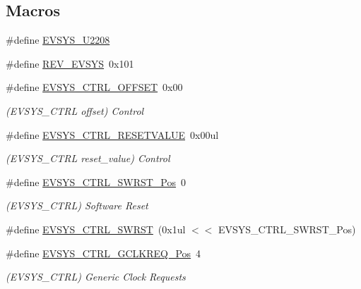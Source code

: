 \subsection*{Macros}
\begin{DoxyCompactItemize}
\item 
\#define \mbox{\hyperlink{group___s_a_m_d21___e_v_s_y_s_ga302b18faf55a928952583067fb99f216}{E\+V\+S\+Y\+S\+\_\+\+U2208}}
\item 
\#define \mbox{\hyperlink{group___s_a_m_d21___e_v_s_y_s_ga973936e91b4175039038db84c581d977}{R\+E\+V\+\_\+\+E\+V\+S\+YS}}~0x101
\item 
\#define \mbox{\hyperlink{group___s_a_m_d21___e_v_s_y_s_gaf12e51333353e278643527fe9c70e572}{E\+V\+S\+Y\+S\+\_\+\+C\+T\+R\+L\+\_\+\+O\+F\+F\+S\+ET}}~0x00
\begin{DoxyCompactList}\small\item\em (E\+V\+S\+Y\+S\+\_\+\+C\+T\+RL offset) Control \end{DoxyCompactList}\item 
\#define \mbox{\hyperlink{group___s_a_m_d21___e_v_s_y_s_ga28dc9aa8a2b2bb58177c09902b9a476a}{E\+V\+S\+Y\+S\+\_\+\+C\+T\+R\+L\+\_\+\+R\+E\+S\+E\+T\+V\+A\+L\+UE}}~0x00ul
\begin{DoxyCompactList}\small\item\em (E\+V\+S\+Y\+S\+\_\+\+C\+T\+RL reset\+\_\+value) Control \end{DoxyCompactList}\item 
\#define \mbox{\hyperlink{group___s_a_m_d21___e_v_s_y_s_gac38a8366d704219f852fdf910470ceb9}{E\+V\+S\+Y\+S\+\_\+\+C\+T\+R\+L\+\_\+\+S\+W\+R\+S\+T\+\_\+\+Pos}}~0
\begin{DoxyCompactList}\small\item\em (E\+V\+S\+Y\+S\+\_\+\+C\+T\+RL) Software Reset \end{DoxyCompactList}\item 
\#define \mbox{\hyperlink{group___s_a_m_d21___e_v_s_y_s_ga0f30a9be04a3581f03205e17f37c8143}{E\+V\+S\+Y\+S\+\_\+\+C\+T\+R\+L\+\_\+\+S\+W\+R\+ST}}~(0x1ul $<$$<$ E\+V\+S\+Y\+S\+\_\+\+C\+T\+R\+L\+\_\+\+S\+W\+R\+S\+T\+\_\+\+Pos)
\item 
\#define \mbox{\hyperlink{group___s_a_m_d21___e_v_s_y_s_ga199431edb74a5ba4d24f4d34abc242be}{E\+V\+S\+Y\+S\+\_\+\+C\+T\+R\+L\+\_\+\+G\+C\+L\+K\+R\+E\+Q\+\_\+\+Pos}}~4
\begin{DoxyCompactList}\small\item\em (E\+V\+S\+Y\+S\+\_\+\+C\+T\+RL) Generic Clock Requests \end{DoxyCompactList}\item 
$$
\end{DoxyCompactItemize}
